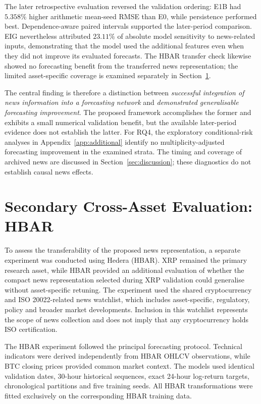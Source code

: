 The later retrospective evaluation reversed the validation ordering: E1B had $5.358\%$ higher arithmetic mean-seed RMSE than E0, while persistence performed best. Dependence-aware paired intervals supported the later-period comparison. EIG nevertheless attributed $23.11\%$ of absolute model sensitivity to news-related inputs, demonstrating that the model used the additional features even when they did not improve its evaluated forecasts. The HBAR transfer check likewise showed no forecasting benefit from the transferred news representation; the limited asset-specific coverage is examined separately in Section~\ref{sec:hbar-transfer}.

The central finding is therefore a distinction between \emph{successful integration of news information into a forecasting network} and \emph{demonstrated generalisable forecasting improvement}. The proposed framework accomplishes the former and exhibits a small numerical validation benefit, but the available later-period evidence does not establish the latter. For RQ4, the exploratory conditional-risk analyses in Appendix~\ref{app:additional} identify no multiplicity-adjusted forecasting improvement in the examined strata. The timing and coverage of archived news are discussed in Section~\ref{sec:discussion}; these diagnostics do not establish causal news effects.



\FloatBarrier
\section{Secondary Cross-Asset Evaluation: HBAR}
\label{sec:hbar-transfer}

To assess the transferability of the proposed news representation, a separate experiment was conducted using Hedera (HBAR). XRP remained the primary research asset, while HBAR provided an additional evaluation of whether the compact news representation selected during XRP validation could generalise without asset-specific retuning. The experiment used the shared cryptocurrency and ISO 20022-related news watchlist, which includes asset-specific, regulatory, policy and broader market developments. Inclusion in this watchlist represents the scope of news collection and does not imply that any cryptocurrency holds ISO certification.

The HBAR experiment followed the principal forecasting protocol. Technical indicators were derived independently from HBAR OHLCV observations, while BTC closing prices provided common market context. The models used identical validation dates, 30-hour historical sequences, exact 24-hour log-return targets, chronological partitions and five training seeds. All HBAR transformations were fitted exclusively on the corresponding HBAR training data.


